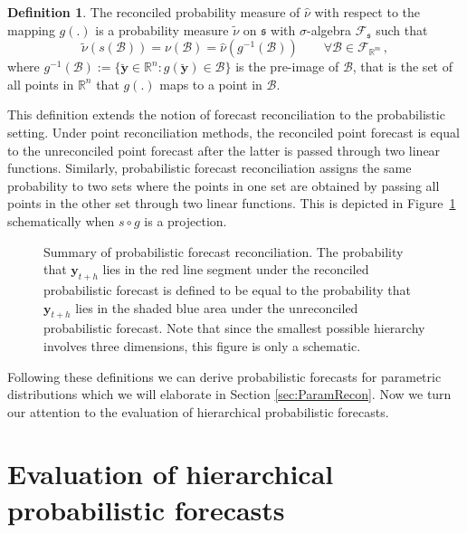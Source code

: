 \documentclass[12pt]{article}
\theoremstyle{definition}
\newtheorem{definition}{Definition}[section]
\begin{document}
\begin{definition} \label{def:reconprob}
	The reconciled probability measure of $\hat{\nu}$ with respect to the mapping $g(.)$ is a probability measure $\tilde{\nu}$ on $\mathfrak{s}$ with $\sigma$-algebra $\mathscr{F}_\mathfrak{s}$ such that
	\begin{equation}
	\tilde{\nu}(s(\mathcal{B})) = \nu(\mathcal{B})= \hat{\nu}(g^{-1}(\mathcal{B})) \qquad \forall \mathcal{B} \in \mathscr{F}_{\mathbb{R}^m}\,,
	\end{equation}
	where $g^{-1}(\mathcal{B}):=\{\breve{\bm{y}}\in \mathbb{R}^n:g(\breve{\bm{y}})\in \mathcal{B}\}$ is the pre-image of $\mathcal{B}$, that is the set of all points in $\mathbb{R}^n$ that $g(.)$ maps to a point in $\mathcal{B}$.
\end{definition}

This definition extends the notion of forecast reconciliation to the probabilistic setting. Under point reconciliation methods, the reconciled point forecast is equal to the unreconciled point forecast after the latter is passed through two linear functions. Similarly, probabilistic forecast reconciliation assigns the same probability to two sets where the points in one set are obtained by passing all points in the other set through two linear functions. This is depicted in Figure~\ref{fig:probfr_sch} schematically when $s\circ g$ is a projection.

\begin{figure}
	
	\caption{Summary of probabilistic forecast reconciliation. The probability that $\bm{y}_{t+h}$ lies in the red line segment under the reconciled probabilistic forecast is defined to be equal to the probability that $\bm{y}_{t+h}$ lies in the shaded blue area under the unreconciled probabilistic forecast. Note that since the smallest possible hierarchy involves three dimensions, this figure is only a schematic.}\label{fig:probfr_sch}
\end{figure}

Following these definitions we can derive probabilistic forecasts for parametric distributions which we will elaborate in Section \ref{sec:ParamRecon}. Now we turn our attention to the evaluation of hierarchical probabilistic forecasts.


\section{Evaluation of hierarchical probabilistic forecasts}\label{sec:evaluation}
\end{document}
